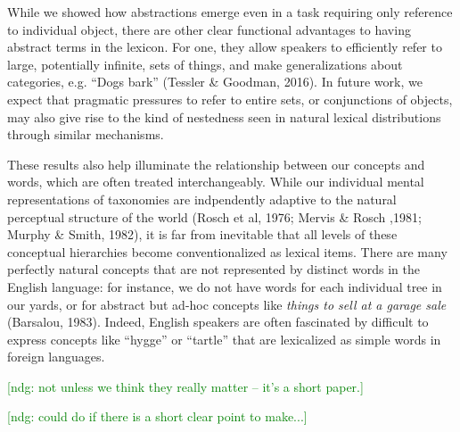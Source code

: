 \documentclass[10pt,letterpaper]{article}
\newcommand{\ndg}[1]{\textcolor{Green}{[ndg: #1]}}
\begin{document}
While we showed how abstractions emerge even in a task requiring only reference to individual object, there are other clear functional advantages to having abstract terms in the lexicon. For one, they allow speakers to efficiently refer to large, potentially infinite, sets of things, and make generalizations about categories, e.g. ``Dogs bark'' (Tessler \& Goodman, 2016). In future work, we expect that pragmatic pressures to refer to entire sets, or conjunctions of objects, may also give rise to the kind of nestedness seen in natural lexical distributions through similar mechanisms.

These results also help illuminate the relationship between our concepts and words, which are often treated interchangeably. While our individual mental representations of taxonomies are indpendently adaptive to the natural perceptual structure of the world (Rosch et al, 1976; Mervis \& Rosch ,1981; Murphy \& Smith, 1982), it is far from inevitable that all levels of these conceptual hierarchies become conventionalized as lexical items. There are many perfectly natural concepts that are not represented by distinct words in the English language: for instance, we do not have words for each individual tree in our yards, or for abstract but ad-hoc concepts like \emph{things to sell at a garage sale} (Barsalou, 1983). Indeed, English speakers are often fascinated by difficult to express concepts like ``hygge'' or ``tartle'' that are lexicalized as simple words in foreign languages.

\ndg{not unless we think they really matter -- it's a short paper.}

\ndg{could do if there is a short clear point to make...}
\end{document}
